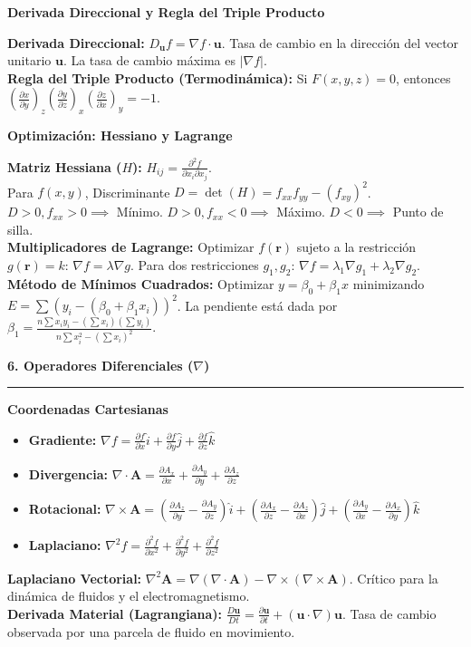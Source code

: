 \documentclass[10pt, landscape, twocolumn]{article}
\newcommand{\cheatsheetsection}[1]{
    \vspace{0.8em}
    {\color{themeblue}\large\bfseries #1} \par
    \vspace{-0.4em}
    {\color{themeblue}\rule{\linewidth}{1pt}} \par
    \vspace{0.3em}
}
\newcommand{\cheatsheetsubsection}[1]{
    \vspace{0.5em}
    {\color{themeblue}\normalsize\bfseries #1} \par
    \vspace{0.2em}
}
\begin{document}
\cheatsheetsubsection{Derivada Direccional y Regla del Triple Producto}
\textbf{Derivada Direccional:} $D_{\mathbf{u}}f = \nabla f \cdot \mathbf{u}$. Tasa de cambio en la dirección del vector unitario $\mathbf{u}$. La tasa de cambio máxima es $|\nabla f|$. \\
\textbf{Regla del Triple Producto (Termodinámica):} Si $F(x,y,z)=0$, entonces $\left(\frac{\partial x}{\partial y}\right)_z \left(\frac{\partial y}{\partial z}\right)_x \left(\frac{\partial z}{\partial x}\right)_y = -1$.

\cheatsheetsubsection{Optimización: Hessiano y Lagrange}
\textbf{Matriz Hessiana ($H$):} $H_{ij} = \frac{\partial^2 f}{\partial x_i \partial x_j}$. \\
Para $f(x,y)$, Discriminante $D = \det(H) = f_{xx}f_{yy} - (f_{xy})^2$. \\
$D>0, f_{xx}>0 \implies$ Mínimo. \quad $D>0, f_{xx}<0 \implies$ Máximo. \quad $D<0 \implies$ Punto de silla. \\
\textbf{Multiplicadores de Lagrange:} Optimizar $f(\mathbf{r})$ sujeto a la restricción $g(\mathbf{r})=k$: $\nabla f = \lambda \nabla g$. Para dos restricciones $g_1, g_2$: $\nabla f = \lambda_1 \nabla g_1 + \lambda_2 \nabla g_2$. \\
\textbf{Método de Mínimos Cuadrados:} Optimizar $y = \beta_0 + \beta_1 x$ minimizando $E = \sum (y_i - (\beta_0 + \beta_1 x_i))^2$. La pendiente está dada por $\beta_1 = \frac{n\sum x_iy_i - (\sum x_i)(\sum y_i)}{n\sum x_i^2 - (\sum x_i)^2}$.

\cheatsheetsection{6. Operadores Diferenciales ($\nabla$)}

\cheatsheetsubsection{Coordenadas Cartesianas}
\begin{itemize}[leftmargin=*, nosep]
    \item \textbf{Gradiente:} $\nabla f = \frac{\partial f}{\partial x}\hat{i} + \frac{\partial f}{\partial y}\hat{j} + \frac{\partial f}{\partial z}\hat{k}$
    \item \textbf{Divergencia:} $\nabla \cdot \mathbf{A} = \frac{\partial A_x}{\partial x} + \frac{\partial A_y}{\partial y} + \frac{\partial A_z}{\partial z}$
    \item \textbf{Rotacional:} $\nabla \times \mathbf{A} = \left(\frac{\partial A_z}{\partial y} - \frac{\partial A_y}{\partial z}\right)\hat{i} + \left(\frac{\partial A_x}{\partial z} - \frac{\partial A_z}{\partial x}\right)\hat{j} + \left(\frac{\partial A_y}{\partial x} - \frac{\partial A_x}{\partial y}\right)\hat{k}$
    \item \textbf{Laplaciano:} $\nabla^2 f = \frac{\partial^2 f}{\partial x^2} + \frac{\partial^2 f}{\partial y^2} + \frac{\partial^2 f}{\partial z^2}$
\end{itemize}
\vspace{0.3em}
\textbf{Laplaciano Vectorial:} $\nabla^2 \mathbf{A} = \nabla(\nabla \cdot \mathbf{A}) - \nabla \times (\nabla \times \mathbf{A})$. Crítico para la dinámica de fluidos y el electromagnetismo.\\
\textbf{Derivada Material (Lagrangiana):} $\frac{D\mathbf{u}}{Dt} = \frac{\partial \mathbf{u}}{\partial t} + (\mathbf{u} \cdot \nabla)\mathbf{u}$. Tasa de cambio observada por una parcela de fluido en movimiento.
\end{document}
